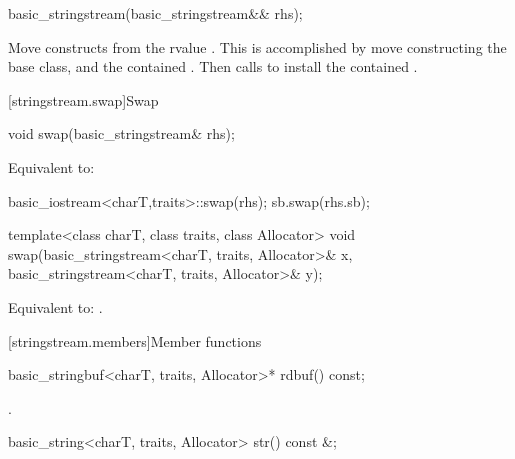 %
\begin{itemdecl}
basic_stringstream(basic_stringstream&& rhs);
\end{itemdecl}

\begin{itemdescr}
\pnum
\effects
Move constructs from the rvalue . This
is accomplished by move constructing the base class, and the contained
.
Then calls 
to install the contained .
\end{itemdescr}

[stringstream.swap]{Swap}

%
\begin{itemdecl}
void swap(basic_stringstream& rhs);
\end{itemdecl}

\begin{itemdescr}
\pnum
\effects
Equivalent to:
\begin{codeblock}
basic_iostream<charT,traits>::swap(rhs);
sb.swap(rhs.sb);
\end{codeblock}
\end{itemdescr}

%
\begin{itemdecl}
template<class charT, class traits, class Allocator>
  void swap(basic_stringstream<charT, traits, Allocator>& x,
            basic_stringstream<charT, traits, Allocator>& y);
\end{itemdecl}

\begin{itemdescr}
\pnum
\effects
Equivalent to: .
\end{itemdescr}

[stringstream.members]{Member functions}

%
\begin{itemdecl}
basic_stringbuf<charT, traits, Allocator>* rdbuf() const;
\end{itemdecl}

\begin{itemdescr}
\pnum
\returns
{}.
\end{itemdescr}

%
\begin{itemdecl}
basic_string<charT, traits, Allocator> str() const &;
\end{itemdecl}

